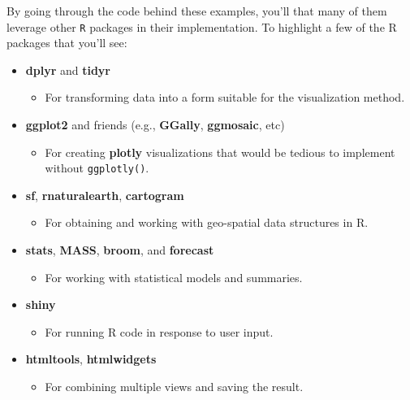 \documentclass[
  12pt,
]{krantz}
\providecommand{\tightlist}{%
  \setlength{\itemsep}{0pt}\setlength{\parskip}{0pt}}
\begin{document}
By going through the code behind these examples, you'll that many of them leverage other \texttt{R} packages in their implementation. To highlight a few of the R packages that you'll see:

\begin{itemize}
\tightlist
\item
  \textbf{dplyr} and \textbf{tidyr}

  \begin{itemize}
  \tightlist
  \item
    For transforming data into a form suitable for the visualization method.
  \end{itemize}
\item
  \textbf{ggplot2} and friends (e.g., \textbf{GGally}, \textbf{ggmosaic}, etc)

  \begin{itemize}
  \tightlist
  \item
    For creating \textbf{plotly} visualizations that would be tedious to implement without \texttt{ggplotly()}.
  \end{itemize}
\item
  \textbf{sf}, \textbf{rnaturalearth}, \textbf{cartogram}

  \begin{itemize}
  \tightlist
  \item
    For obtaining and working with geo-spatial data structures in R.
  \end{itemize}
\item
  \textbf{stats}, \textbf{MASS}, \textbf{broom}, and \textbf{forecast}

  \begin{itemize}
  \tightlist
  \item
    For working with statistical models and summaries.
  \end{itemize}
\item
  \textbf{shiny}

  \begin{itemize}
  \tightlist
  \item
    For running R code in response to user input.
  \end{itemize}
\item
  \textbf{htmltools}, \textbf{htmlwidgets}

  \begin{itemize}
  \tightlist
  \item
    For combining multiple views and saving the result.
  \end{itemize}
\end{itemize}
\end{document}

